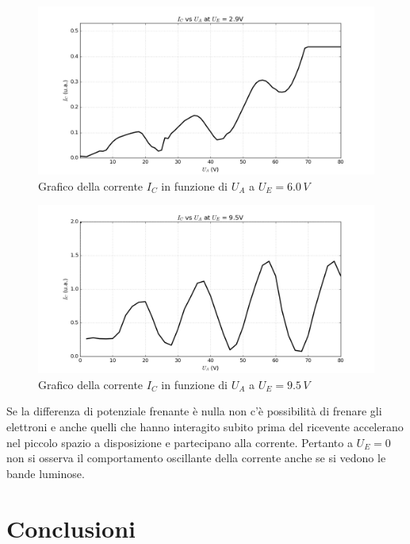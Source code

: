 \documentclass[10pt,a4paper]{article}
\begin{document}
\begin{table}[!htb]
\begin{table}[!htb]
\begin{figure}[!htb]
  \centering
  \includegraphics[scale=.5]{plot60.png}
\caption{Grafico della corrente $I_C$ in funzione di $U_A$ a $U_E = 6.0 \, V$}
\label{grafico5}
\end{figure}

\begin{figure}[!htb]
  \centering
  \includegraphics[scale=.5]{plot95.png}
\caption{Grafico della corrente $I_C$ in funzione di $U_A$ a $U_E = 9.5 \, V$}
\label{grafico6}
\end{figure}

Se la differenza di potenziale frenante è nulla non c'è possibilità di frenare gli elettroni e anche quelli che hanno interagito subito prima del ricevente accelerano nel piccolo spazio a disposizione e partecipano alla corrente. Pertanto a $U_E = 0$ non si osserva il comportamento oscillante della corrente anche se si vedono le bande luminose.\\


\section{Conclusioni}


\end{table}
\end{table}
\end{document}
